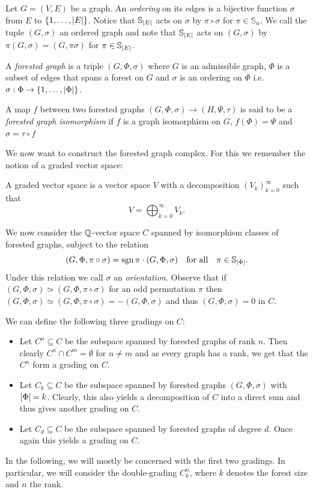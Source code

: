 \begin{definition}
	Let $G = (V,E)$ be a graph. An \emph{ordering} on its edges is a bijective function $\sigma$ from $E$ to $\{1,\ldots,\abs{E}\}$.
	Notice that $\mathbb{S}_{\abs{E}}$ acts on $\sigma$ by $\pi \circ \sigma$ for $\pi \in \mathbb{S}_{n}$.
	We call the tuple $(G,\sigma)$ an ordered graph and note that $\mathbb{S}_{\abs{E}}$ acts on $(G,\sigma)$ by $\pi (G,\sigma) = (G,\pi \sigma)$ for $\pi \in \mathbb{S}_{\abs{E}}$.

	A \emph{forested graph} is a triple $(G,\Phi,\sigma)$ where $G$ is an admissible graph, $\Phi$ is a subset of edges that spans a forest on $G$ and 
	$\sigma$ is an ordering on $\Phi$ i.e. $\sigma : \Phi \to \{1,\ldots,\abs{\Phi}\}$.

	A map $f$ between two forested graphs $(G,\Phi, \sigma) \to (H,\Psi, \tau)$ is said to be a \emph{forested graph isomorphism} if 
	$f$ is a graph isomorphism on $G$,  $f(\Phi) = \Psi$ and $\sigma = \tau \circ f $
\end{definition}

We now want to construct the forested graph complex. For this we remember the notion of a graded vector space:
\begin{definition}
	A graded vector space is a vector space $V$ with a decomposition $\left(V_{k}\right)^{\infty}_{k=0} $ such that
	\[
		V = \bigoplus_{k=0}^{\infty} V_{k}
	.\] 
\end{definition}

We now consider the $\mathbb{Q}$-vector space $C$ spanned by isomorphism classes of forested graphs, subject to the relation
\[
	(G,\Phi, \pi \circ \sigma) = \sgn{\pi} \cdot (G,\Phi, \sigma) \qq{for all} \pi \in \mathbb{S}_{\abs{\Phi}}
.\]
Under this relation we call $\sigma$ an \emph{orientation}.
Observe that if $(G,\Phi, \sigma) \simeq (G,\Phi, \pi \circ \sigma)$ for an odd permutation $\pi$ then 
$(G,\Phi, \sigma) \simeq (G,\Phi, \pi \circ \sigma) = - (G,\Phi, \sigma)$ and thus $(G,\Phi, \sigma) = 0$ in  $C$.

We can define the following three gradings on $C$:
 \begin{itemize}
	\item Let $C^{n} \subseteq C$ be the subspace spanned by forested graphs of rank $n$. Then clearly  $C^{n} \cap C^{m} = \emptyset$ for $n \neq m$ and
		as every graph has a rank, we get that the $C^{n}$ form a grading on $C$.
	\item Let $C_{k} \subseteq C$ be the subspace spanned by forested graphs $(G,\Phi,\sigma)$ with $\abs{\Phi} = k$. Clearly, this also yields a decomposition of $C$ into a direct sum
		and thus gives another grading on $C$.
	\item Let  $C_{d} \subseteq C$ be the subspace spanned by forested graphs of degree $d$. Once again this yields a grading on $C$.
\end{itemize}
In the following, we will mostly be concerned with the first two gradings. In particular, we will consider the double-grading $C_{k}^{n}$,
where $k$ denotes the forest size and $n$ the rank. 

